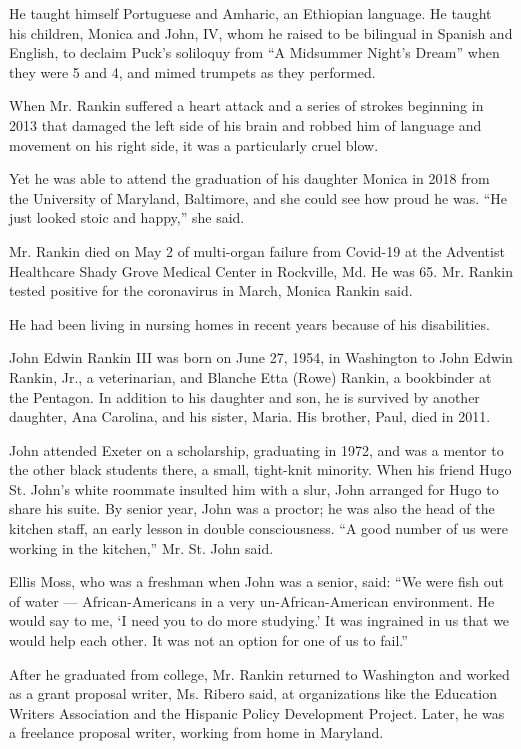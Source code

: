 He taught himself Portuguese and Amharic, an Ethiopian language. He
taught his children, Monica and John, IV, whom he raised to be bilingual
in Spanish and English, to declaim Puck's soliloquy from ``A Midsummer
Night's Dream'' when they were 5 and 4, and mimed trumpets as they
performed.

When Mr. Rankin suffered a heart attack and a series of strokes
beginning in 2013 that damaged the left side of his brain and robbed him
of language and movement on his right side, it was a particularly cruel
blow.

Yet he was able to attend the graduation of his daughter Monica in 2018
from the University of Maryland, Baltimore, and she could see how proud
he was. ``He just looked stoic and happy,'' she said.

Mr. Rankin died on May 2 of multi-organ failure from Covid-19 at the
Adventist Healthcare Shady Grove Medical Center in Rockville, Md. He was
65. Mr. Rankin tested positive for the coronavirus in March, Monica
Rankin said.

He had been living in nursing homes in recent years because of his
disabilities.

John Edwin Rankin III was born on June 27, 1954, in Washington to John
Edwin Rankin, Jr., a veterinarian, and Blanche Etta (Rowe) Rankin, a
bookbinder at the Pentagon. In addition to his daughter and son, he is
survived by another daughter, Ana Carolina, and his sister, Maria. His
brother, Paul, died in 2011.

John attended Exeter on a scholarship, graduating in 1972, and was a
mentor to the other black students there, a small, tight-knit minority.
When his friend Hugo St. John's white roommate insulted him with a slur,
John arranged for Hugo to share his suite. By senior year, John was a
proctor; he was also the head of the kitchen staff, an early lesson in
double consciousness. ``A good number of us were working in the
kitchen,'' Mr. St. John said.

Ellis Moss, who was a freshman when John was a senior, said: ``We were
fish out of water --- African-Americans in a very un-African-American
environment. He would say to me, `I need you to do more studying.' It
was ingrained in us that we would help each other. It was not an option
for one of us to fail.''

After he graduated from college, Mr. Rankin returned to Washington and
worked as a grant proposal writer, Ms. Ribero said, at organizations
like the Education Writers Association and the Hispanic Policy
Development Project. Later, he was a freelance proposal writer, working
from home in Maryland.

